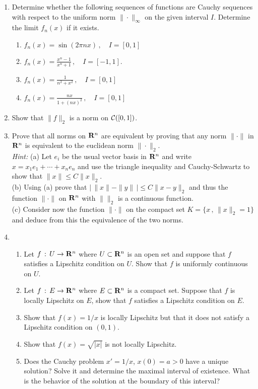 \documentclass[12pt]{report}
\newcommand{\calC}{{\cal C}}
\newcommand{\bR}{{\bf R}}
\def\to{\rightarrow}
\begin{document}
\begin{enumerate}

\item Determine whether the following sequences of functions are Cauchy sequences
with respect to the uniform norm $\| \cdot \|_\infty$ on the given interval $I$. Determine the 
limit $f_n(x)$ if it exists. 
\begin{enumerate}
\item ${\displaystyle f_n(x)= \sin(2 \pi nx)} \,, \quad I=[0,1]$
\item ${\displaystyle f_n(x) = \frac{x^n -1}{x^n+1}\,, \quad   I=[-1,1]}$. 
\item ${\displaystyle f_n(x) = \frac{1}{n^2 + x^2}} \,,\quad I=[0,1]$
\item ${\displaystyle f_n(x)= \frac{nx}{1 + (nx)^2}}\,, \quad I=[0,1]$
\end{enumerate}

\item Show that $\|f\|_2$ is a norm on $\calC([0,1])$. 

\item Prove that all norms on $\bR^n$ are equivalent by proving 
that any norm $\| \cdot \|$ in $\bR^n$ is equivalent to the
euclidean norm $\|\cdot \|_2$. \\ 
{\em Hint:} (a) Let $e_i$ be the usual vector basis in  $\bR^n$ and write 
$x=x_1 e_1 + \cdots + x_n e_n$ and use the triangle inequality and Cauchy-Schwartz to show 
that $\|x\| \le C \|x\|_2$.   \\
(b) Using (a) prove that $\left|\, \|x\| - \|y\|\, \right| \le C \|x-y\|_2$ and thus the function $\| \cdot \|$ on 
$\bR^n$ with $\| \|_2$ is a continuous function. \\
(c) Consider now the function $\| \cdot \|$ on the compact set $K= \{ x \,,\, \|x\|_2 =1\}$
 and deduce from this the equivalence of the two norms.

\item 
\begin{enumerate}
\item Let $f \,:\, U \to \bR^n$ where $U \subset \bR^n$ is an open set
and suppose that $f$ satisfies a Lipschitz condition on $U$. Show that
$f$ is uniformly continuous on $U$.
\item Let $f \,:\, E \to \bR^n$ where $E \subset \bR^n$ is a compact set. 
Suppose that $f$ is locally Lipschitz on $E$, show that $f$ satisfies a Lipschitz 
condition on $E$.  
\item Show that $f(x)=1/x$ is locally Lipschitz but that it does not satisfy a Lipschitz condition on
$(0,1)$. 
\item Show that $f(x) = \sqrt{|x|}$ is not locally Lipschitz. 
\item Does the Cauchy problem $x' =1/x$, $x(0)= a >0$ have a unique
solution?  Solve it and determine the maximal interval of existence.
What is the behavior of the solution at the boundary of this interval?
\end{enumerate}



\end{enumerate}
\end{document}
